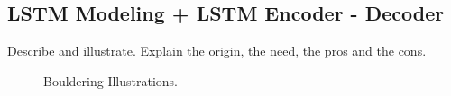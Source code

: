 \subsection{\textbf{LSTM Modeling + LSTM Encoder - Decoder}}
Describe and illustrate. Explain the origin, the need, the pros and the cons.
\begin{figure}[h]
    \centering
    \caption{Bouldering Illustrations.}
\end{figure}
